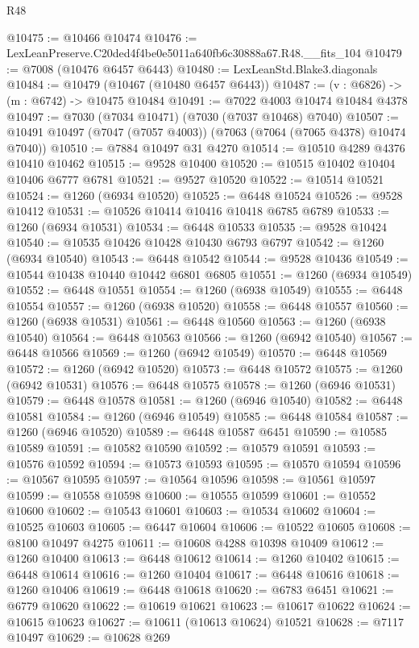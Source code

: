 \begin{lexlean}{R48}
\begin{coremodule}
@10475 := @10466 @10474
@10476 := LexLeanPreserve.C20ded4f4be0e5011a640fb6c30888a67.R48.__fits_104
@10479 := @7008 (@10476 @6457 @6443)
@10480 := LexLeanStd.Blake3.diagonals
@10484 := @10479 (@10467 (@10480 @6457 @6443))
@10487 := (v : @6826) -> (m : @6742) -> @10475 @10484
@10491 := @7022 @4003 @10474 @10484 @4378
@10497 := @7030 (@7034 @10471) (@7030 (@7037 @10468) @7040)
@10507 := @10491 @10497 (@7047 (@7057 @4003)) (@7063 (@7064 (@7065 @4378) @10474 @7040))
@10510 := @7884 @10497 @31 @4270
@10514 := @10510 @4289 @4376 @10410 @10462
@10515 := @9528 @10400
@10520 := @10515 @10402 @10404 @10406 @6777 @6781
@10521 := @9527 @10520
@10522 := @10514 @10521
@10524 := @1260 (@6934 @10520)
@10525 := @6448 @10524
@10526 := @9528 @10412
@10531 := @10526 @10414 @10416 @10418 @6785 @6789
@10533 := @1260 (@6934 @10531)
@10534 := @6448 @10533
@10535 := @9528 @10424
@10540 := @10535 @10426 @10428 @10430 @6793 @6797
@10542 := @1260 (@6934 @10540)
@10543 := @6448 @10542
@10544 := @9528 @10436
@10549 := @10544 @10438 @10440 @10442 @6801 @6805
@10551 := @1260 (@6934 @10549)
@10552 := @6448 @10551
@10554 := @1260 (@6938 @10549)
@10555 := @6448 @10554
@10557 := @1260 (@6938 @10520)
@10558 := @6448 @10557
@10560 := @1260 (@6938 @10531)
@10561 := @6448 @10560
@10563 := @1260 (@6938 @10540)
@10564 := @6448 @10563
@10566 := @1260 (@6942 @10540)
@10567 := @6448 @10566
@10569 := @1260 (@6942 @10549)
@10570 := @6448 @10569
@10572 := @1260 (@6942 @10520)
@10573 := @6448 @10572
@10575 := @1260 (@6942 @10531)
@10576 := @6448 @10575
@10578 := @1260 (@6946 @10531)
@10579 := @6448 @10578
@10581 := @1260 (@6946 @10540)
@10582 := @6448 @10581
@10584 := @1260 (@6946 @10549)
@10585 := @6448 @10584
@10587 := @1260 (@6946 @10520)
@10589 := @6448 @10587 @6451
@10590 := @10585 @10589
@10591 := @10582 @10590
@10592 := @10579 @10591
@10593 := @10576 @10592
@10594 := @10573 @10593
@10595 := @10570 @10594
@10596 := @10567 @10595
@10597 := @10564 @10596
@10598 := @10561 @10597
@10599 := @10558 @10598
@10600 := @10555 @10599
@10601 := @10552 @10600
@10602 := @10543 @10601
@10603 := @10534 @10602
@10604 := @10525 @10603
@10605 := @6447 @10604
@10606 := @10522 @10605
@10608 := @8100 @10497 @4275
@10611 := @10608 @4288 @10398 @10409
@10612 := @1260 @10400
@10613 := @6448 @10612
@10614 := @1260 @10402
@10615 := @6448 @10614
@10616 := @1260 @10404
@10617 := @6448 @10616
@10618 := @1260 @10406
@10619 := @6448 @10618
@10620 := @6783 @6451
@10621 := @6779 @10620
@10622 := @10619 @10621
@10623 := @10617 @10622
@10624 := @10615 @10623
@10627 := @10611 (@10613 @10624) @10521
@10628 := @7117 @10497
@10629 := @10628 @269

\end{coremodule}
\end{lexlean}
